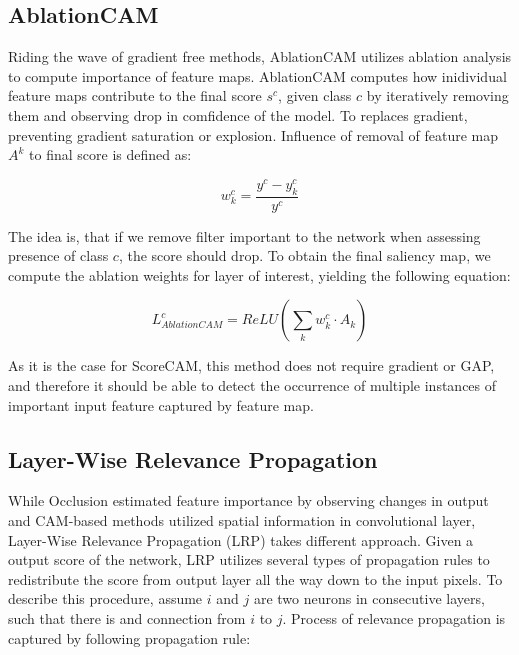 
\subsection{AblationCAM}


Riding the wave of gradient free methods, AblationCAM utilizes ablation analysis to compute importance of feature maps. AblationCAM computes how inidividual feature maps contribute to the final score $s^c$, given class $c$ by iteratively removing them and observing drop in comfidence of the model. To replaces gradient, preventing gradient saturation or explosion. Influence of removal of feature map $A^k$ to final score is defined as:

\begin{equation}
    w^c_k = \frac{y^c - y^c_k}{y^c}
\end{equation}

The idea is, that if we remove filter important to the network when assessing presence of class $c$, the score should drop. To obtain the final saliency map, we compute the ablation weights for layer of interest, yielding the following equation:

\begin{equation}
    L^c_{AblationCAM} = ReLU(\sum_k w^c_k \cdot A_k)
\end{equation}

As it is the case for ScoreCAM, this method does not require gradient or GAP, and therefore it should be able to detect the occurrence of multiple instances of important input feature captured by feature map.

\subsection{Layer-Wise Relevance Propagation}

While Occlusion estimated feature importance by observing changes in output and CAM-based methods utilized spatial information in convolutional layer, Layer-Wise Relevance Propagation (LRP) takes different approach. Given a output score of the network, LRP utilizes several types of propagation rules to redistribute the score from output layer all the way down to the input pixels. To describe this procedure, assume $i$ and $j$ are two neurons in consecutive layers, such that there is and connection from $i$ to $j$. Process of relevance propagation is captured by following propagation rule:

